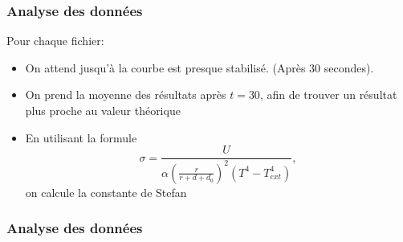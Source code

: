 \documentclass{beamer}
\begin{document}
\begin{frame}
\frametitle{Analyse des données}
Pour chaque fichier:
\begin{itemize}
	\item{On attend jusqu'à la courbe est presque stabilisé. (Après 30 secondes).}
	\item{On prend la moyenne des résultats après $t=30$, afin de trouver un résultat plus proche au valeur théorique}
	\item{En utilisant la formule $$\sigma = \frac{U}{\alpha\left(\frac{r}{r+d+d_0}\right)^2 (T^4-T_{ext}^4)},$$ on calcule la constante de Stefan}

\end{itemize}
\end{frame}





\begin{frame}
\frametitle{Analyse des données}
\begin{table}[htdp]\begin{center}
 \caption{Erreur absolue (erreur relative)}\end{center}\label{defaulttable}\end{table}

\end{frame}
\end{document}
